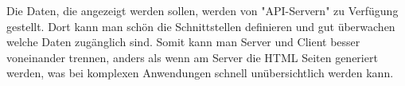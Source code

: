 Die Daten, die angezeigt werden sollen, werden von "API-Servern" zu Verfügung gestellt. Dort kann man schön die Schnittstellen definieren und gut überwachen welche Daten zugänglich sind. Somit kann man Server und Client besser voneinander trennen, anders als wenn am Server die HTML Seiten generiert werden, was bei komplexen Anwendungen schnell unübersichtlich werden kann.


